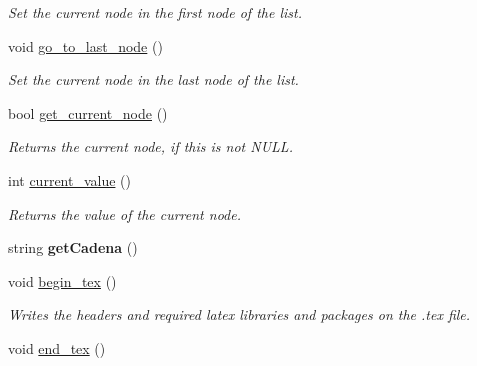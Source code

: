 \begin{DoxyCompactItemize}
\begin{DoxyCompactList}\small\item\em Set the current node in the first node of the list. \end{DoxyCompactList}\item 
\hypertarget{classlist_a3d9c0dd74589893d2e8337f6b2fa78ac}{void \hyperlink{classlist_a3d9c0dd74589893d2e8337f6b2fa78ac}{go\-\_\-to\-\_\-last\-\_\-node} ()}\label{classlist_a3d9c0dd74589893d2e8337f6b2fa78ac}

\begin{DoxyCompactList}\small\item\em Set the current node in the last node of the list. \end{DoxyCompactList}\item 
\hypertarget{classlist_af3be16d99b45856c9222dec685628122}{bool \hyperlink{classlist_af3be16d99b45856c9222dec685628122}{get\-\_\-current\-\_\-node} ()}\label{classlist_af3be16d99b45856c9222dec685628122}

\begin{DoxyCompactList}\small\item\em Returns the current node, if this is not N\-U\-L\-L. \end{DoxyCompactList}\item 
\hypertarget{classlist_a4a401135cd9300328664b4295f8bcbb1}{int \hyperlink{classlist_a4a401135cd9300328664b4295f8bcbb1}{current\-\_\-value} ()}\label{classlist_a4a401135cd9300328664b4295f8bcbb1}

\begin{DoxyCompactList}\small\item\em Returns the value of the current node. \end{DoxyCompactList}\item 
\hypertarget{classlist_af9c57f43f632e0c885c2393dc375ccf9}{string {\bfseries get\-Cadena} ()}\label{classlist_af9c57f43f632e0c885c2393dc375ccf9}

\item 
\hypertarget{classlist_ae62b808b02ddd303878ee7459349e093}{void \hyperlink{classlist_ae62b808b02ddd303878ee7459349e093}{begin\-\_\-tex} ()}\label{classlist_ae62b808b02ddd303878ee7459349e093}

\begin{DoxyCompactList}\small\item\em Writes the headers and required latex libraries and packages on the .tex file. \end{DoxyCompactList}\item 
\hypertarget{classlist_ad0581363cabe43d9524e27321bf19cc0}{void \hyperlink{classlist_ad0581363cabe43d9524e27321bf19cc0}{end\-\_\-tex} ()}\label{classlist_ad0581363cabe43d9524e27321bf19cc0}


\end{DoxyCompactItemize}
